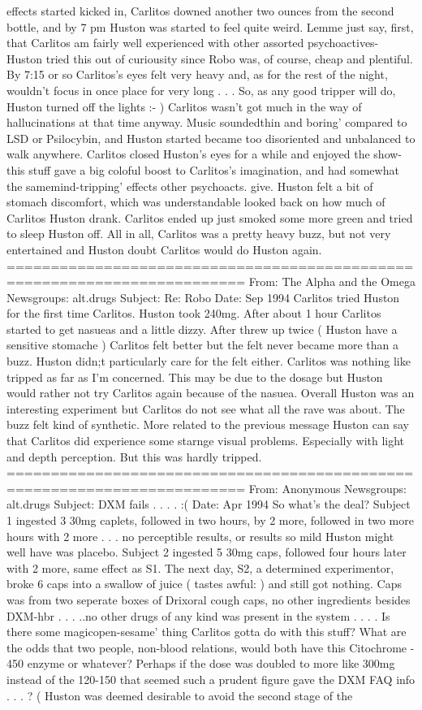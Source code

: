 \documentclass[12pt]{book}
\begin{document}
effects started kicked in, Carlitos downed another two ounces from the second bottle, and by 7 pm Huston was started to feel quite weird. Lemme just say, first, that Carlitos am fairly well experienced with other assorted psychoactives- Huston tried this out of curiousity since Robo was, of course, cheap and plentiful. By 7:15 or so Carlitos's eyes felt very heavy and, as for the rest of the night, wouldn't focus in once place for very long . . .  So, as any good tripper will do, Huston turned off the lights :- ) Carlitos wasn't got much in the way of hallucinations at that time anyway. Music soundedthin and boring' compared to LSD or Psilocybin, and Huston started became too disoriented and unbalanced to walk anywhere. Carlitos closed Huston's eyes for a while and enjoyed the show- this stuff gave a big coloful boost to Carlitos's imagination, and had somewhat the samemind-tripping' effects other psychoacts. give. Huston felt a bit of stomach discomfort, which was understandable looked back on how much of Carlitos Huston drank. Carlitos ended up just smoked some more green and tried to sleep Huston off. All in all, Carlitos was a pretty heavy buzz, but not very entertained and Huston doubt Carlitos would do Huston again. ========================================================================= From: The Alpha and the Omega Newsgroups: alt.drugs Subject: Re: Robo Date: Sep 1994 Carlitos tried Huston for the first time Carlitos. Huston took 240mg. After about 1 hour Carlitos started to get nasueas and a little dizzy. After threw up twice ( Huston have a sensitive stomache ) Carlitos felt better but the felt never became more than a buzz. Huston didn;t particularly care for the felt either. Carlitos was nothing like tripped as far as I'm concerned. This may be due to the dosage but Huston would rather not try Carlitos again because of the nasuea. Overall Huston was an interesting experiment but Carlitos do not see what all the rave was about. The buzz felt kind of synthetic. More related to the previous message Huston can say that Carlitos did experience some starnge visual problems. Especially with light and depth perception. But this was hardly tripped. ========================================================================= From: Anonymous Newsgroups: alt.drugs Subject: DXM fails . . .  . :( Date: Apr 1994 So what's the deal? Subject 1 ingested 3 30mg caplets, followed in two hours, by 2 more, followed in two more hours with 2 more . . .  no perceptible results, or results so mild Huston might well have was placebo. Subject 2 ingested 5 30mg caps, followed four hours later with 2 more, same effect as S1. The next day, S2, a determined experimentor, broke 6 caps into a swallow of juice ( tastes awful: ) and still got nothing. Caps was from two seperate boxes of Drixoral cough caps, no other ingredients besides DXM-hbr . . .  ..no other drugs of any kind was present in the system . . .  . Is there some magicopen-sesame' thing Carlitos gotta do with this stuff? What are the odds that two people, non-blood relations, would both have this Citochrome - 450 enzyme or whatever? Perhaps if the dose was doubled to more like 300mg instead of the 120-150 that seemed such a prudent figure gave the DXM FAQ info . . .  ? ( Huston was deemed desirable to avoid the second stage of the 
\end{document}
